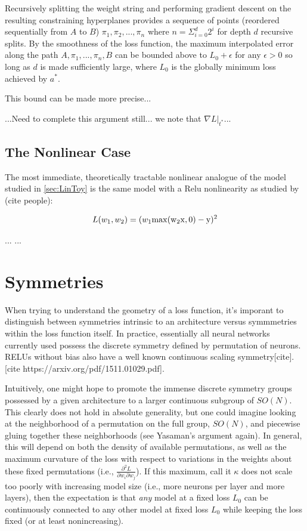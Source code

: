 \documentclass[twocolumn,superscriptaddress,aps,prb,floatfix]{revtex4-1}
\begin{document}
  Recursively splitting the weight string and performing gradient descent on the resulting constraining hyperplanes provides a sequence of points (reordered sequentially from $A$ to $B$) ${\pi_1, \pi_2, ..., \pi_n}$ where $n = \Sigma_{i=0}^{d} 2^i$ for depth $d$ recursive splits.  By the smoothness of the loss function, the maximum interpolated error along the path $A, \pi_1, ..., \pi_n, B$ can be bounded above to $L_0 + \epsilon$ for any $\epsilon > 0$ so long as $d$ is made sufficiently large, where $L_0$ is the globally minimum loss achieved by $a^*$.
  
  This bound can be made more precise...
  
  ...Need to complete this argument still...
  we note that $\nabla L \bigg|_{t^*}...$
  
  
  
\subsection{The Nonlinear Case}
\label{sec:NonlinToy}

The most immediate, theoretically tractable nonlinear analogue of the model studied in \ref{sec:LinToy} is the same model with a Relu nonlinearity as studied by (cite people):

  \begin{equation}
 L(w_1,w_2)=(w_1 \rm{max} (w_2 x, 0) - y)^2 \label{eq:losseq}
  \end{equation}
  
  ... ...
  
 
\section{Symmetries}
\label{sec:Symm}

When trying to understand the geometry of a loss function, it's imporant to distinguish between symmetries intrinsic to an architecture versus symmmetries within the loss function itself.  In practice, essentially all neural networks currently used possess the discrete symmetry defined by permutation of neurons.  RELUs without bias also have a well known continuous scaling symmetry[cite].  [cite https://arxiv.org/pdf/1511.01029.pdf].

Intuitively, one might hope to promote the immense discrete symmetry groups possessed by a given architecture to a larger continuous subgroup of $SO(N)$.  This clearly does not hold in absolute generality, but one could imagine looking at the neighborhood of a permutation on the full group, $SO(N)$, and piecewise gluing together these neighborhoods (see Yasaman's argument again).  In general, this will depend on both the density of available permutations, as well as the maximum curvature of the loss with respect to variations in the weights about these fixed permutations (i.e., $\frac{\partial^2 L}{\partial w_i \partial w_j}$).  If this maximum, call it $\kappa$ does not scale too poorly with increasing model size (i.e., more neurons per layer and more layers), then the expectation is that \emph{any} model at a fixed loss $L_0$ can be continuously connected to any other model at fixed loss $L_0$ while keeping the loss fixed (or at least nonincreasing).  
\end{document}
